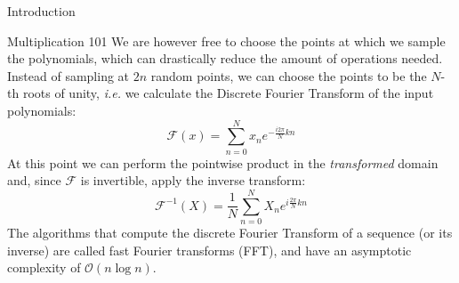 \documentclass[a4paper,10pt]{article}
\begin{document}
\begin{section}{Introduction}
\begin{subsection}{Multiplication 101}
    We are however free to choose the points at which we sample the polynomials, which can drastically reduce the amount of operations needed.
    Instead of sampling at $2n$ random points, we can choose the points to be the $N$-th roots of unity, \textit{i.e.} we calculate the Discrete
    Fourier Transform of the input polynomials:
    \begin{equation}
        \mathcal{F}(x) = \sum_{n=0}^{N} x_n e^{-\frac{i2\pi}{N}kn}
    \end{equation}\label{DFT}
    At this point we can perform the pointwise product in the \textit{transformed} domain and, since $\mathcal{F}$ is invertible, apply the inverse transform:
    \begin{equation}
        \mathcal{F}^{-1}(X) = \frac{1}{N}\sum_{n=0}^{N} X_n e^{i\frac{2\pi}{N}kn}
    \end{equation}
    The algorithms that compute the discrete Fourier Transform of a sequence (or its inverse) are called fast Fourier transforms (FFT), and have an asymptotic complexity
    of $\mathcal{O}(n\log n)$.


\end{subsection}
\end{section}
\end{document}
